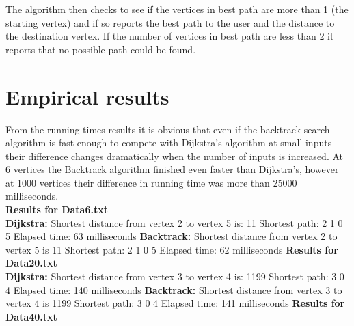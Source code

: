 \documentclass{article}
\begin{document}
\begin{itemize}
The algorithm then checks to see if the vertices in best path are more than 1 (the starting vertex) and if so reports the best path to the user and the distance to the destination vertex. If the number of vertices in best path are less than 2 it reports that no possible path could be found.
\end{itemize}

\section*{Empirical results}
From the running times results it is obvious that even if the backtrack search algorithm is fast enough to compete with Dijkstra's algorithm at small inputs their difference changes dramatically when the number of inputs is increased. At 6 vertices the Backtrack algorithm finished even faster than Dijkstra's, however at 1000 vertices their difference in running time was more than 25000 milliseconds.\\
\newline
\textbf{Results for Data6.txt\\}
\textbf{Dijkstra:\newline}
Shortest distance from vertex 2 to vertex 5 is: 11\newline
Shortest path: 2 1 0 5 \newline
Elapsed time: 63 milliseconds \newline
\textbf{Backtrack:\newline}
Shortest distance from vertex 2 to vertex 5 is 11\newline
Shortest path: 2 1 0 5\newline
Elapsed time: 62 milliseconds\newline
\newline
\textbf{Results for Data20.txt\\}
\textbf{Dijkstra:\newline}
Shortest distance from vertex 3 to vertex 4 is: 1199\newline
Shortest path: 3 0 4 \newline
Elapsed time: 140 milliseconds\newline
\textbf{Backtrack:\newline}
Shortest distance from vertex 3 to vertex 4 is 1199\newline
Shortest path: 3 0 4\newline
Elapsed time: 141 milliseconds\newline
\newline
\textbf{Results for Data40.txt\\}
\end{document}
